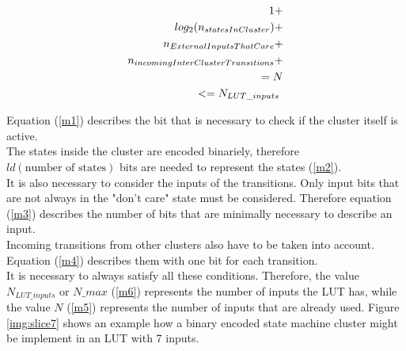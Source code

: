 \begin{center}
\begin{eqnarray}
1\vspace{1cm} \label{m1}+\\
log_2(n_{statesInCluster}) \label{m2}+ \\
n_{ExternalInputsThatCare} \label{m3}+ \\
n_{incomingInterClusterTransitions} \label{m4}+ \\
= N \label{m5}\\
<= N_{LUT\_inputs} \label{m6}\
\end{eqnarray}
\end{center}

Equation (\ref{m1}) describes the bit that is necessary to check if the cluster itself is active.\\
The states inside the cluster are encoded binariely, therefore $ld(\text{number of states})$ bits are needed to represent the states (\ref{m2}). \\
It is also necessary to consider the inputs of the transitions. Only input bits that are not always in the "don't care" state must be considered. Therefore equation (\ref{m3}) describes the number of bits that are minimally necessary to describe an input. \\
Incoming transitions from other clusters also have to be taken into account. Equation (\ref{m4}) describes them with one bit for each transition. \\

It is necessary to always satisfy all these conditions. Therefore, the value $N_{LUT\_inputs}$ or $N\_max$ (\ref{m6}) represents the number of inputs the LUT has, while the value $N$ (\ref{m5}) represents the number of inputs that are already used.
Figure \ref{img:slice7} shows an example how a binary encoded state machine cluster might be implement in an LUT with 7 inputs.


